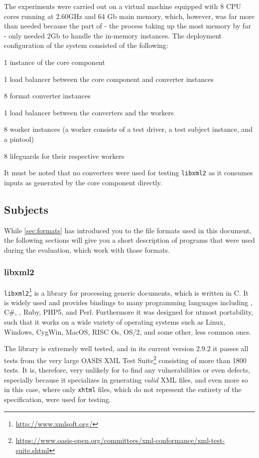 The experiments were carried out on a virtual machine equipped with 8 CPU cores running at 2.60GHz and 64 Gb
main memory, which, however, was far more than needed because the \java part of \xmlmate - the process taking
up the most memory by far - only needed 2Gb to handle the in-memory \xml instances. The deployment
configuration of the \xmlmate system consisted of the following:
\begin{itemize*}
  \item 1 instance of the \java \xmlmate core component
  \item 1 load balancer between the core component and converter instances
  \item 8 format converter instances
  \item 1 load balancer between the converters and the workers
  \item 8 worker instances (a worker consists of a test driver, a test subject instance, and a pintool)
  \item 8 lifeguards for their respective workers
\end{itemize*}

It must be noted that no converters were used for testing \texttt{libxml2} as it consumes inputs as generated
by the \xmlmate core component directly.




\subsection{Subjects}
While \cref{sec:formats} has introduced you to the file formats used in this document, the following sections
will give you a short description of programs that were used during the evaluation, which work with those
formats.
\subsubsection{libxml2}
\texttt{libxml2}\footnote{\url{http://www.xmlsoft.org/}} is a library for processing generic \xml documents,
which is written in {\small C}. It is widely used and provides bindings to many programming languages
including \cpp, {\small C\#}, \python{}, {\small Ruby}, {\small PHP5}, and {\small Perl}. Furthermore it was
designed for utmost portability, such that it works on a wide variety of operating systems such as
Linux, Windows, CygWin, MacOS, RISC Os, OS/2, and some other, less common ones.

The library is extremely well tested, and in its current version 2.9.2 it passes all tests from the very large
OASIS XML Test Suite\footnote{\url{https://www.oasis-open.org/committees/xml-conformance/xml-test-suite.shtml}}
consisting of more than 1800 tests. It is, therefore, very unlikely for \xmlmate to find any vulnerabilities
or even defects, especially because it specializes in generating \emph{valid} XML files, and even more so in
this case, where only \texttt{xhtml} files, which do not represent the entirety of the \xml specification,
were used for testing.

